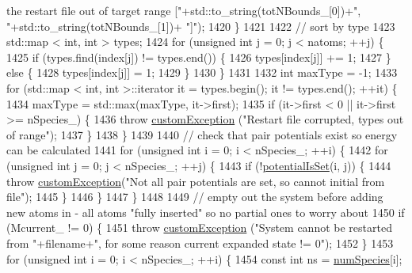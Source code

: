 \begin{DoxyCode}
{       the restart file out of target range ["}+std::to\_string(totNBounds\_[0])+\textcolor{stringliteral}{", "}+std::to\_string(totNBounds\_[1])+\textcolor{stringliteral}{
      "]"});
1420     \}
1421 
1422     \textcolor{comment}{// sort by type}
1423     std::map < int, int > types;
1424     \textcolor{keywordflow}{for} (\textcolor{keywordtype}{unsigned} \textcolor{keywordtype}{int} j = 0; j < natoms; ++j) \{
1425         \textcolor{keywordflow}{if} (types.find(index[j]) != types.end()) \{
1426             types[index[j]] += 1;
1427         \} \textcolor{keywordflow}{else} \{
1428             types[index[j]] = 1;
1429         \}
1430     \}
1431 
1432     \textcolor{keywordtype}{int} maxType = -1;
1433     \textcolor{keywordflow}{for} (std::map < int, int >::iterator it = types.begin(); it != types.end(); ++it) \{
1434         maxType = std::max(maxType, it->first);
1435         \textcolor{keywordflow}{if} (it->first < 0 || it->first >= nSpecies\_) \{
1436             \textcolor{keywordflow}{throw} \hyperlink{classcustom_exception}{customException} (\textcolor{stringliteral}{"Restart file corrupted, types out of range"});
1437         \}
1438     \}
1439 
1440     \textcolor{comment}{// check that pair potentials exist so energy can be calculated}
1441     \textcolor{keywordflow}{for} (\textcolor{keywordtype}{unsigned} \textcolor{keywordtype}{int} i = 0; i < nSpecies\_; ++i) \{
1442         \textcolor{keywordflow}{for} (\textcolor{keywordtype}{unsigned} \textcolor{keywordtype}{int} j = 0; j < nSpecies\_; ++j) \{
1443             \textcolor{keywordflow}{if} (!\hyperlink{classsim_system_a40af191fae6091e26413ee06ae188ae9}{potentialIsSet}(i, j)) \{
1444                 \textcolor{keywordflow}{throw} \hyperlink{classcustom_exception}{customException}(\textcolor{stringliteral}{"Not all pair potentials are set, so cannot initial
       from file"});
1445             \}
1446         \}
1447     \}
1448 
1449     \textcolor{comment}{// empty out the system before adding new atoms in - all atoms "fully inserted" so no partial ones to
       worry about}
1450     \textcolor{keywordflow}{if} (Mcurrent\_ != 0) \{
1451         \textcolor{keywordflow}{throw} \hyperlink{classcustom_exception}{customException} (\textcolor{stringliteral}{"System cannot be restarted from "}+filename+\textcolor{stringliteral}{", for some
       reason current expanded state != 0"});
1452     \}
1453     \textcolor{keywordflow}{for} (\textcolor{keywordtype}{unsigned} \textcolor{keywordtype}{int} i = 0; i < nSpecies\_; ++i) \{
1454         \textcolor{keyword}{const} \textcolor{keywordtype}{int} ns = \hyperlink{classsim_system_a9eea865e6dc1cff377b1e79c4d9c23f0}{numSpecies}[i];

\end{DoxyCode}

